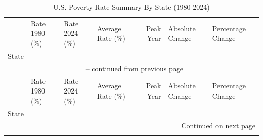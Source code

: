 \begin{longtable}{llllrll}
\caption{U.S. Poverty Rate Summary By State (1980-2024)}
\label{tab:poverty_summary} \\

\toprule
 & Rate 1980 (\%) & Rate 2024 (\%) & Average Rate (\%) & Peak Year & Absolute Change & Percentage Change \\
State &  &  &  &  &  &  \\
\midrule
\endfirsthead

\multicolumn{7}{c}{{\tablename\ \thetable{} -- continued from previous page}} \\
\toprule
 & Rate 1980 (\%) & Rate 2024 (\%) & Average Rate (\%) & Peak Year & Absolute Change & Percentage Change \\
State &  &  &  &  &  &  \\
\midrule
\endhead

\midrule
\multicolumn{7}{r}{{Continued on next page}} \\
\endfoot

\bottomrule
\endlastfoot


\end{longtable}
